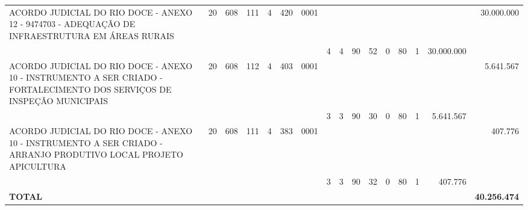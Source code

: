 \documentclass{article}
\begin{document}
\begin{longtable}[c]{m{6.5cm}|m{1pt}m{1pt}m{1pt}m{1pt}m{1pt}m{1pt}|m{1pt}m{1pt}m{0.5pt}m{1pt}|m{1pt}|m{1pt}m{1pt}|m{1pt}|m{2pt}}
\multicolumn{1}{L{5.5cm}|}{ ACORDO JUDICIAL DO RIO DOCE - ANEXO 12 - 9474703 - ADEQUAÇÃO DE INFRAESTRUTURA EM ÁREAS RURAIS } & \multicolumn{1}{c}{ 20 } & \multicolumn{1}{c}{ 608 } & \multicolumn{1}{c}{ 111 } & \multicolumn{1}{l}{ 4 } & \multicolumn{1}{c}{ 420 } & \multicolumn{1}{l|}{ 0001 } & & & & & & & & & \multicolumn{1}{r}{ 30.000.000 } \\
& & & & & & & \multicolumn{1}{c}{ 4 } & \multicolumn{1}{c}{ 4 } & \multicolumn{1}{c}{ 90 } & \multicolumn{1}{c|}{ 52 } & \multicolumn{1}{c|}{ 0 } & \multicolumn{1}{l}{ 80 } & \multicolumn{1}{c|}{ 1 } & \multicolumn{1}{r|}{ 30.000.000 } & \\
\multicolumn{1}{L{5.5cm}|}{ ACORDO JUDICIAL DO RIO DOCE - ANEXO 10 - INSTRUMENTO A SER CRIADO - FORTALECIMENTO DOS SERVIÇOS DE INSPEÇÃO MUNICIPAIS } & \multicolumn{1}{c}{ 20 } & \multicolumn{1}{c}{ 608 } & \multicolumn{1}{c}{ 112 } & \multicolumn{1}{l}{ 4 } & \multicolumn{1}{c}{ 403 } & \multicolumn{1}{l|}{ 0001 } & & & & & & & & & \multicolumn{1}{r}{ 5.641.567 } \\
& & & & & & & \multicolumn{1}{c}{ 3 } & \multicolumn{1}{c}{ 3 } & \multicolumn{1}{c}{ 90 } & \multicolumn{1}{c|}{ 30 } & \multicolumn{1}{c|}{ 0 } & \multicolumn{1}{l}{ 80 } & \multicolumn{1}{c|}{ 1 } & \multicolumn{1}{r|}{ 5.641.567 } & \\
\multicolumn{1}{L{5.5cm}|}{ ACORDO JUDICIAL DO RIO DOCE - ANEXO 10 - INSTRUMENTO A SER CRIADO - ARRANJO PRODUTIVO LOCAL PROJETO APICULTURA } & \multicolumn{1}{c}{ 20 } & \multicolumn{1}{c}{ 608 } & \multicolumn{1}{c}{ 111 } & \multicolumn{1}{l}{ 4 } & \multicolumn{1}{c}{ 383 } & \multicolumn{1}{l|}{ 0001 } & & & & & & & & & \multicolumn{1}{r}{ 407.776 } \\
& & & & & & & \multicolumn{1}{c}{ 3 } & \multicolumn{1}{c}{ 3 } & \multicolumn{1}{c}{ 90 } & \multicolumn{1}{c|}{ 32 } & \multicolumn{1}{c|}{ 0 } & \multicolumn{1}{l}{ 80 } & \multicolumn{1}{c|}{ 1 } & \multicolumn{1}{r|}{ 407.776 } & \\
\hline
\multicolumn{15}{C{6cm}|}{\textbf{ TOTAL }} & \multicolumn{1}{r}{\textbf{ 40.256.474 }} \\
\end{longtable}
\newpage
{}
{}
\renewcommand*{\arraystretch}{1.9}
\scriptsize
\color{myblack}
\centering
\end{document}
